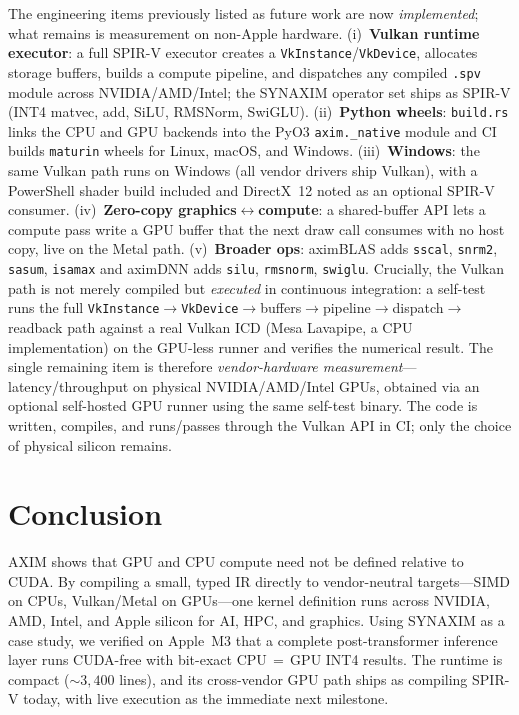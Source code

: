 \documentclass[11pt,a4paper]{article}
\begin{document}
The engineering items previously listed as future work are now \emph{implemented}; what
remains is measurement on non-Apple hardware. (i)~\textbf{Vulkan runtime executor}: a full
SPIR-V executor creates a \texttt{VkInstance}/\texttt{VkDevice}, allocates storage buffers,
builds a compute pipeline, and dispatches any compiled \texttt{.spv} module across
NVIDIA/AMD/Intel; the SYNAXIM operator set ships as SPIR-V (INT4 matvec, add, SiLU, RMSNorm,
SwiGLU). (ii)~\textbf{Python wheels}: \texttt{build.rs} links the CPU and GPU backends into
the PyO3 \texttt{axim.\_native} module and CI builds \texttt{maturin} wheels for Linux,
macOS, and Windows. (iii)~\textbf{Windows}: the same Vulkan path runs on Windows (all vendor
drivers ship Vulkan), with a PowerShell shader build included and DirectX~12 noted as an
optional SPIR-V consumer. (iv)~\textbf{Zero-copy graphics$\leftrightarrow$compute}: a
shared-buffer API lets a compute pass write a GPU buffer that the next draw call consumes
with no host copy, live on the Metal path. (v)~\textbf{Broader ops}: aximBLAS adds
\texttt{sscal}, \texttt{snrm2}, \texttt{sasum}, \texttt{isamax} and aximDNN adds
\texttt{silu}, \texttt{rmsnorm}, \texttt{swiglu}. Crucially, the Vulkan path is not merely
compiled but \emph{executed} in continuous integration: a self-test runs the full
\texttt{VkInstance}$\to$\texttt{VkDevice}$\to$buffers$\to$pipeline$\to$dispatch$\to$readback
path against a real Vulkan ICD (Mesa Lavapipe, a CPU implementation) on the GPU-less runner
and verifies the numerical result. The single remaining item is therefore
\emph{vendor-hardware measurement}---latency/throughput on physical NVIDIA/AMD/Intel GPUs,
obtained via an optional self-hosted GPU runner using the same self-test binary. The code is
written, compiles, and runs/passes through the Vulkan API in CI; only the choice of physical
silicon remains.

\section{Conclusion}

AXIM shows that GPU and CPU compute need not be defined relative to CUDA. By compiling a
small, typed IR directly to vendor-neutral targets---SIMD on CPUs, Vulkan/Metal on GPUs---one
kernel definition runs across NVIDIA, AMD, Intel, and Apple silicon for AI, HPC, and graphics.
Using SYNAXIM as a case study, we verified on Apple~M3 that a complete post-transformer
inference layer runs CUDA-free with bit-exact CPU\,$=$\,GPU INT4 results. The runtime is
compact (${\sim}3{,}400$ lines), and its cross-vendor GPU path ships as compiling SPIR-V
today, with live execution as the immediate next milestone.
\end{document}
